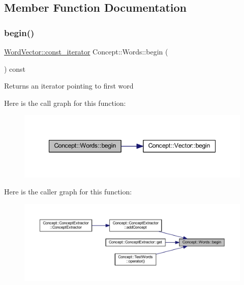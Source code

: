 \subsection{Member Function Documentation}
\mbox{\label{class_concept_1_1_words_a90f042f181232ee4ca33668e1c7d82c9}} 
\subsubsection{\texorpdfstring{begin()}{begin()}}
{\footnotesize\ttfamily \mbox{\hyperlink{class_concept_1_1_vector}{Word\+Vector\+::const\+\_\+iterator}} Concept\+::\+Words\+::begin (\begin{DoxyParamCaption}{ }\end{DoxyParamCaption}) const\hspace{0.3cm}{\ttfamily [inline]}}

\begin{DoxyReturn}{Returns}
an iterator pointing to first word 
\end{DoxyReturn}
Here is the call graph for this function\+:\nopagebreak
\begin{figure}[H]
\begin{center}
\leavevmode
\includegraphics[width=348pt]{class_concept_1_1_words_a90f042f181232ee4ca33668e1c7d82c9_cgraph}
\end{center}
\end{figure}
Here is the caller graph for this function\+:\nopagebreak
\begin{figure}[H]
\begin{center}
\leavevmode
\includegraphics[width=350pt]{class_concept_1_1_words_a90f042f181232ee4ca33668e1c7d82c9_icgraph}
\end{center}
\end{figure}
\mbox{\label{class_concept_1_1_words_a9d52168c7d5655db4aaf8959c011f549}} 
